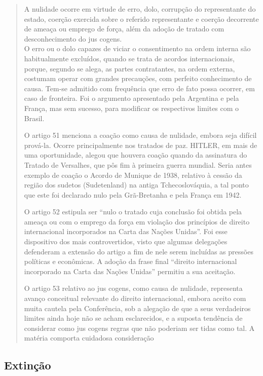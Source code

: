 \documentclass{article}
\begin{document}
\begin{quote}
    A nulidade ocorre em virtude de erro, dolo, corrupção do representante do estado, coerção exercida sobre o referido representante e coerção decorrente de ameaça ou emprego de força, além da adoção de tratado com desconhecimento do jus cogens.\\

    O erro ou o dolo capazes de viciar o consentimento na ordem interna são habitualmente excluídos, quando se trata de acordos internacionais, porque, segundo se alega, as partes contratantes, na ordem externa, costumam operar com grandes precauções, com perfeito conhecimento de causa. Tem-se admitido com frequência que erro de fato possa ocorrer, em caso de fronteira. Foi o argumento apresentado pela Argentina e pela França, mas sem sucesso, para modificar os respectivos limites com o Brasil.

    O artigo 51 menciona a coação como causa de nulidade, embora seja difícil prová-la. Ocorre principalmente nos tratados de paz. HITLER, em mais de uma oportunidade, alegou que houvera coação quando da assinatura do Tratado de Versalhes, que pôs fim à primeira guerra mundial. Seria antes exemplo de coação o Acordo de Munique de 1938, relativo à cessão da região dos sudetos (Sudetenland) na antiga Tchecoslováquia, a tal ponto que este foi declarado nulo pela Grã-Bretanha e pela França em 1942.
    
    O artigo 52 estipula ser “nulo o tratado cuja conclusão foi obtida pela ameaça ou com o emprego da força em violação dos princípios de direito internacional incorporados na Carta das Nações Unidas”. Foi esse dispositivo dos mais controvertidos, visto que algumas delegações defenderam a extensão do artigo a fim de nele serem incluídas as pressões políticas e econômicas. A adoção da frase final “direito internacional incorporado na Carta das Nações Unidas” permitiu a sua aceitação.
    
    O artigo 53 relativo ao jus cogens, como causa de nulidade, representa avanço conceitual relevante do direito internacional, embora aceito com muita cautela pela Conferência, sob a alegação de que a seus verdadeiros limites ainda hoje não se acham esclarecidos, e a suposta tendência de considerar como jus cogens regras que não poderiam ser tidas como tal. A matéria comporta cuidadosa consideração \cite[p.~166-167]{accioly_manual_2023}
\end{quote}

\subsection{Extinção}
\end{document}
